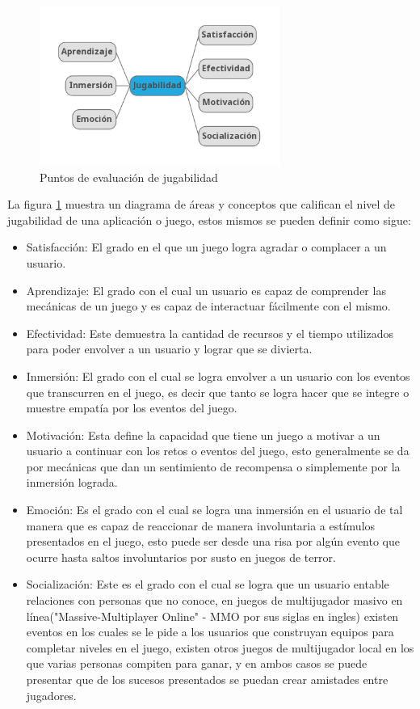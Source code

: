 \begin{figure}
    \centering
    \includegraphics[width=0.7\textwidth]{img/playabilityv2.png}
    \caption{Puntos de evaluación de jugabilidad}
    \label{figure:playability}
\end{figure}

La figura \ref{figure:playability} muestra un diagrama de áreas y conceptos que
califican el nivel de jugabilidad de una aplicación o juego, estos mismos se
pueden definir como sigue:

\begin{itemize}
    \item Satisfacción: El grado en el que un juego logra agradar o complacer a
    un usuario.
    \item Aprendizaje: El grado con el cual un usuario es capaz de comprender
    las mecánicas de un juego y es capaz de interactuar fácilmente con el mismo.
    \item Efectividad: Este demuestra la cantidad de recursos y el tiempo
    utilizados para poder envolver a un usuario y lograr que se divierta.
    \item Inmersión: El grado con el cual se logra envolver a un usuario con los
    eventos que transcurren en el juego, es decir que tanto se logra hacer que
    se integre o muestre empatía por los eventos del juego.
    \item Motivación: Esta define la capacidad que tiene un juego a motivar a un
    usuario a continuar con los retos o eventos del juego, esto generalmente se
    da por mecánicas que dan un sentimiento de recompensa o simplemente por la
    inmersión lograda.
    \item Emoción: Es el grado con el cual se logra una inmersión en el usuario
    de tal manera que es capaz de reaccionar de manera involuntaria a estímulos
    presentados en el juego, esto puede ser desde una risa por algún evento que
    ocurre hasta saltos involuntarios por susto en juegos de terror.
    \item Socialización: Este es el grado con el cual se logra que un usuario
    entable relaciones con personas que no conoce, en juegos de multijugador
    masivo en línea("Massive-Multiplayer Online" - MMO por sus siglas en ingles)
    existen eventos en los cuales se le pide a los usuarios que construyan
    equipos para completar niveles en el juego, existen otros juegos de
    multijugador local en los que varias personas compiten para ganar, y en
    ambos casos se puede presentar que de los sucesos presentados se puedan
    crear amistades entre jugadores.\cite{sanchez2009playability}
\end{itemize}

